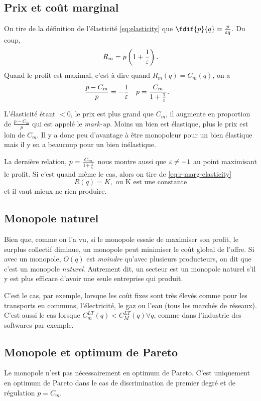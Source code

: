 \subsection{Prix et coût marginal}
On tire de la définition de l'élasticité \eqref{eq:elasticity} que
$\fdif{p}{q} = \frac{p}{\elasticity q}$. Du coup,
\begin{equation} 
	R_m = p\left(1+\frac{1}{\varepsilon}\right).
	\label{eq:r-marg-elasticity}
\end{equation}
Quand le profit est maximal, c'est à
dire quand $R_m(q) = C_m(q)$, on a
\begin{align*}
  \frac{p-C_m}{p} & = -\frac{1}{\varepsilon} &
  p & = \frac{C_m}{1+\frac{1}{\varepsilon}}.
\end{align*}

L'élasticité étant $< 0$, le prix est plus grand
que $C_m$, il augmente en proportion de
$\frac{p-C_m}{p}$ qui est appelé le \emph{mark-up}.
Moins un bien est élastique, plus le prix est loin de $C_m$.
Il y a donc peu d'avantage à être monopoleur pour un bien élastique
mais il y en a beaucoup pour un bien inélastique.

La dernière relation, $p = \frac{C_m}{1+\frac{1}{\varepsilon}}$
nous montre aussi que $\varepsilon \neq -1$ au point maximisant
le profit. Si c'est quand même le cas, alors on tire
de \eqref{eq:r-marg-elasticity}
\[ R(q) = K, \text{ ou K est une constante} \]
et il vaut mieux ne rien produire.

\subsection{Monopole naturel}
\label{sec:mono-nat}
Bien que, comme on l'a vu, si le monopole essaie de maximiser
son profit, le surplus collectif diminue,
un monopole peut minimiser le coût global de l'offre.
Si avec un monopole, $O(q)$ est \emph{moindre} qu'avec plusieurs producteurs,
on dit que c'est un monopole \emph{naturel}. Autrement dit,
un secteur est un monopole naturel s'il y est plus
efficace d'avoir une seule entreprise qui produit.

C'est le cas, par exemple, lorsque les coût fixes sont très élevés comme
pour les transports en communs, l'électricité, le gaz ou l'eau
(tous les marchés de réseaux). C'est aussi le cas lorsque
$C_m^{LT}(q) < C_M^{LT}(q) \forall q$, comme dans l'industrie
des softwares par exemple.

\subsection{Monopole et optimum de Pareto}
\label{ref:monopareto}
Le monopole n'est pas nécessairement en optimum de Pareto.
C'est uniquement en optimum de Pareto dans le cas de discrimination
de premier degré et de régulation $p = C_m$.

